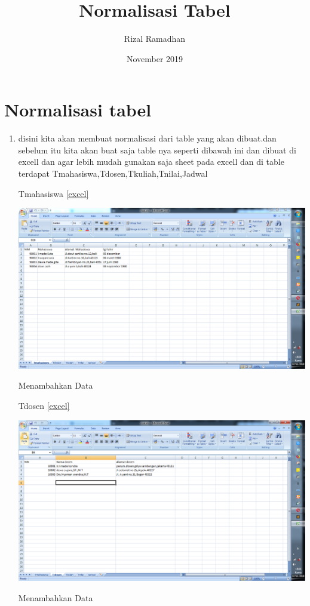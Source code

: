 \documentclass{article}
\title{Normalisasi Tabel}
\author{Rizal Ramadhan }
\date{November 2019}
\begin{document}
\maketitle

\section{Normalisasi tabel}
\begin{enumerate}
    \item disini kita akan membuat normalisasi dari table yang akan dibuat.dan sebelum itu kita akan buat saja table nya seperti dibawah ini dan dibuat di excell dan agar lebih mudah gunakan saja sheet pada excell dan di table terdapat Tmahasiswa,Tdosen,Tkuliah,Tnilai,Jadwal
    
        Tmahasiswa
    \ref{excel}
    \begin{center}
         \centering
            \includegraphics[scale=0.27]{gambar/1.png}
        \caption{Menambahkan Data}
        \label{excel}
    \end{center}
    
        Tdosen
    \ref{excel}
    \begin{center}
         \centering
            \includegraphics[scale=0.27]{gambar/2.png}
        \caption{Menambahkan Data}
        \label{excel}
    \end{center}
    

\end{enumerate}
\end{document}
